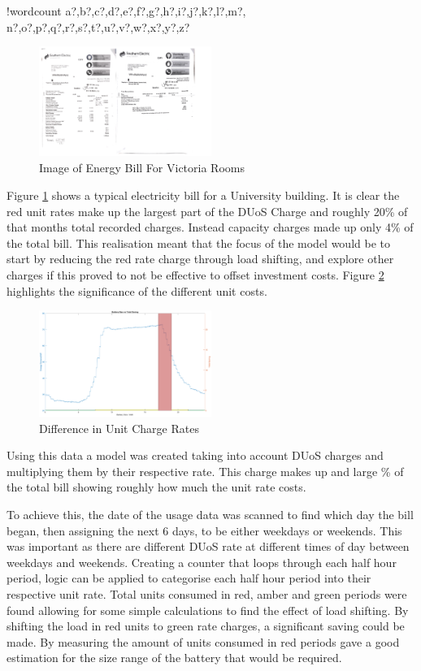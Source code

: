 \documentclass[fontsize=9.5pt]{extarticle}
\numberwithin{figure}{section} %
\newcounter{words}
\newenvironment{counted}{%
  \setcounter{words}{0}
  \SearchList!{wordcount}{\stepcounter{words}}
    {a?,b?,c?,d?,e?,f?,g?,h?,i?,j?,k?,l?,m?,
    n?,o?,p?,q?,r?,s?,t?,u?,v?,w?,x?,y?,z?}
  \UndoBoundary{'}
  \SearchOrder{p;}}{%
  \StopSearching}
\begin{document}
\begin{counted}
\begin{figure}[H]
 \centering
 \includegraphics[trim = 0 0 0 0, clip, width=0.5\textwidth]{Development-38.png}
 \caption{Image of Energy Bill For Victoria Rooms}
 \label{Development-38}
 \end{figure}

Figure \ref{Development-38} shows a typical electricity bill for a
University building. It is clear the red unit rates make up the largest
part of the DUoS Charge and roughly 20\% of that months total recorded
charges. Instead capacity charges made up only 4\% of the total bill.
This realisation meant that the focus of the model would be to start by
reducing the red rate charge through load shifting, and explore other
charges if this proved to not be effective to offset investment costs.
Figure \ref{Development-50} highlights the significance of the different
unit costs.

\begin{figure}[H]
 \centering
 \includegraphics[trim = 0 0 0 0, clip, width=0.5\textwidth]{Development-50.eps}
 \caption{Difference in Unit Charge Rates}
 \label{Development-50}
 \end{figure}

Using this data a model was created taking into account DUoS charges and
multiplying them by their respective rate. This charge makes up and
large \% of the total bill showing roughly how much the unit rate costs.

To achieve this, the date of the usage data was scanned to find which
day the bill began, then assigning the next 6 days, to be either
weekdays or weekends. This was important as there are different DUoS
rate at different times of day between weekdays and weekends. Creating a
counter that loops through each half hour period, logic can be applied
to categorise each half hour period into their respective unit rate.
Total units consumed in red, amber and green periods were found allowing
for some simple calculations to find the effect of load shifting. By
shifting the load in red units to green rate charges, a significant
saving could be made. By measuring the amount of units consumed in red
periods gave a good estimation for the size range of the battery that
would be required.


\end{counted}
\end{document}
